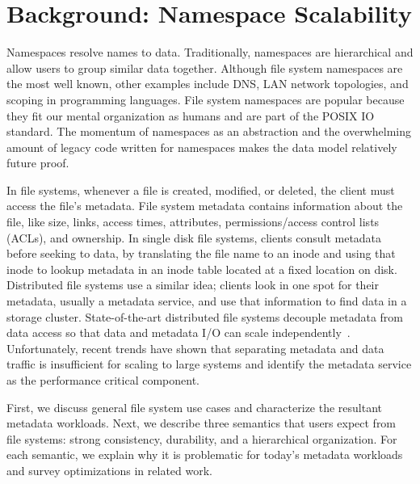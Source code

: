 \chapter{Background: Namespace Scalability}
\label{chp:related-work}

Namespaces resolve names to data. Traditionally, namespaces are hierarchical
and allow users to group similar data together. Although file system namespaces
are the most well known, other examples include DNS, LAN network topologies,
and scoping in programming languages.  File system namespaces are popular
because they fit our mental organization as humans and are part of the POSIX IO
standard. The momentum of namespaces as an abstraction and the overwhelming
amount of legacy code written for namespaces makes the data model relatively
future proof.

In file systems, whenever a file is created, modified, or deleted, the client
must access the file's metadata. File system metadata contains information
about the file, like size, links, access times, attributes, permissions/access
control lists (ACLs), and ownership.  In single disk file systems, clients
consult metadata before seeking to data, by translating the file name to an
inode and using that inode to lookup metadata in an inode table located at a
fixed location on disk.  Distributed file systems use a similar idea; clients
look in one spot for their metadata, usually a metadata service, and use that
information to find data in a storage cluster.  State-of-the-art distributed
file systems decouple metadata from data access so that data and metadata I/O
can scale independently~\cite{alam:pdsw2011-metadata-scaling,
ghemawat:sosp2003-gfs, hildebrand:msst2005-pnfs, weil:osdi2006-ceph,
welch:fast2008-panasas, xing:sc2009-skyfs}.  Unfortunately, recent trends have
shown that separating metadata and data traffic is insufficient for scaling to
large systems and identify the metadata service as the performance critical
component.

First, we discuss general file system use cases and characterize the resultant
metadata workloads. Next, we describe three semantics that users expect from
file systems: strong consistency, durability, and a hierarchical organization.
For each semantic, we explain why it is problematic for today's metadata
workloads and survey optimizations in related work.

